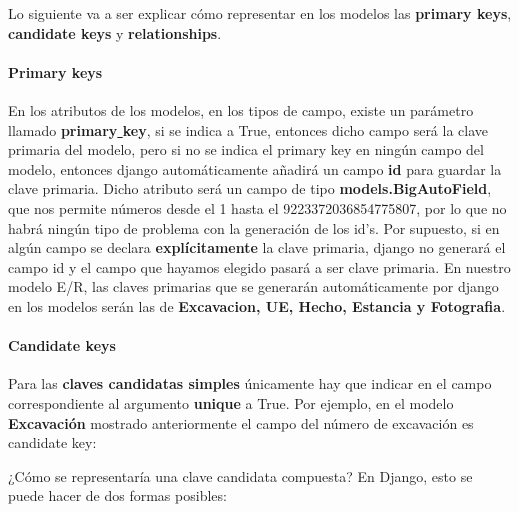     Lo siguiente va a ser explicar cómo representar en los modelos las \textbf{primary keys},
    \textbf{candidate keys} y \textbf{relationships}.\\
    
    \paragraph{Primary keys} \underline{}
    \newline En los atributos de los modelos, en los tipos de campo, existe un parámetro llamado
    \textbf{primary\underline{ }key}, si se indica a True, entonces dicho campo será la clave
    primaria del modelo, pero si no se indica el primary key en ningún campo del modelo,
    entonces django automáticamente añadirá un campo \textbf{id} para guardar la clave primaria.
    Dicho atributo será un campo de tipo \textbf{models.BigAutoField}, que nos permite números
    desde el 1 hasta el 9223372036854775807, por lo que no habrá ningún tipo de problema con
    la generación de los id's. Por supuesto, si en algún campo se declara \textbf{explícitamente}
    la clave primaria, django no generará el campo id y el campo que hayamos elegido pasará a
    ser clave primaria. En nuestro modelo E/R, las claves primarias que se generarán
    automáticamente por django en los modelos serán las de \textbf{Excavacion, UE, Hecho,
    Estancia y Fotografia}. 
    
    \paragraph{Candidate keys} \underline{}
    \newline Para las \textbf{claves candidatas simples} únicamente hay que indicar en el campo
    correspondiente al argumento \textbf{unique} a True. Por ejemplo, en el modelo
    \textbf{Excavación} mostrado anteriormente el campo del número de excavación es
    candidate key:
    

    ¿Cómo se representaría una clave candidata compuesta? En Django, esto se puede hacer de
    dos formas posibles:

